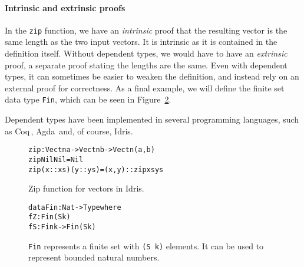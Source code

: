 \paragraph{Intrinsic and extrinsic proofs} In the \texttt{zip} function, we have an \emph{intrinsic} proof that the resulting vector is the same length as the two input vectors. It is intrinsic as it is contained in the definition itself. Without dependent types, we would have to have an \emph{extrinsic} proof, a separate proof stating the lengths are the same. Even with dependent types, it can sometimes be easier to weaken the definition, and instead rely on an external proof for correctness. As a final example, we will define the finite set data type \texttt{Fin}, which can be seen in Figure~\ref{fig:fin}.

Dependent types have been implemented in several programming languages, such as Coq\,\cite{Coq}, Agda\,\cite{Agda} and, of course, Idris. 

\begin{figure}
\begin{alltt}
zip : Vect n a -> Vect n b -> Vect n (a, b)
zip Nil       Nil       = Nil
zip (x :: xs) (y :: ys) = (x, y) :: zip xs ys
\end{alltt}
\caption{Zip function for vectors in Idris.}
\label{fig:zip}
\end{figure}

\begin{figure}
\begin{alltt}
data Fin : Nat -> Type where
  fZ : Fin (S k)
  fS : Fin k -> Fin (S k)
\end{alltt}
\caption{\texttt{Fin} represents a finite set with \texttt{(S k)} elements. It can be used to represent bounded natural numbers.}
\label{fig:fin}
\end{figure}
